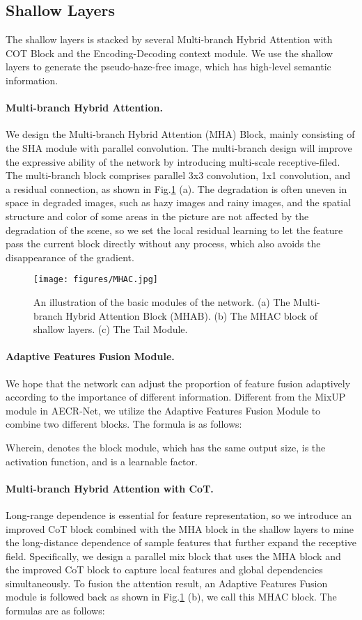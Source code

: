 \documentclass[final]{cvpr}
\begin{document}
\subsection{Shallow Layers}
The shallow layers is stacked by several Multi-branch Hybrid Attention with COT Block and the Encoding-Decoding context module. We use the shallow layers to generate the pseudo-haze-free image, which has high-level semantic information.
\paragraph{Multi-branch Hybrid Attention.}
We design the Multi-branch Hybrid Attention (MHA) Block, mainly consisting of the SHA module with parallel convolution. The multi-branch design will improve the expressive ability of the network by introducing multi-scale receptive-filed. The multi-branch block comprises parallel 3x3 convolution, 1x1 convolution, and a residual connection, as shown in Fig.\ref{fig:BasicBlock} (a). 
The degradation is often uneven in space in degraded images, such as hazy images and rainy images, and the spatial structure and color of some areas in the picture are not affected by the degradation of the scene, so we set the local residual learning to let the feature pass the current block directly without any process, which also avoids the disappearance of the gradient.
\begin{figure}[b]
    \centering
    \texttt{[image: figures/MHAC.jpg]}
    \caption{An illustration of the basic modules of the network. (a) The Multi-branch Hybrid Attention Block (MHAB). (b) The MHAC block of shallow layers. (c) The Tail Module.}
    \label{fig:BasicBlock}
\end{figure}
\paragraph{Adaptive Features Fusion Module.}
We hope that the network can adjust the proportion of feature fusion adaptively according to the importance of different information. Different from the MixUP \cite{wu2021contrastive} module in AECR-Net, we utilize the Adaptive Features Fusion Module to combine two different blocks. The formula is as follows:

Wherein,  denotes the block module, which has the same output size,  is the  activation function, and  is a learnable factor.

\paragraph{Multi-branch Hybrid Attention with CoT.}
Long-range dependence is essential for feature representation, so we introduce an improved CoT \cite{li2021contextual} block combined with the MHA block in the shallow layers to mine the long-distance dependence of sample features that further expand the receptive field.
Specifically, we design a parallel mix block that uses the MHA block and the improved CoT block to capture local features and global dependencies simultaneously. To fusion the attention result, an Adaptive Features Fusion module is followed back as shown in Fig.\ref{fig:BasicBlock} (b), we call this MHAC block. The formulas are as follows:
\end{document}
